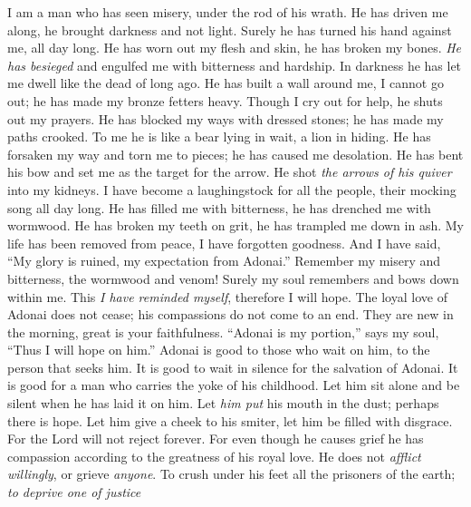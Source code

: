 \begin{biblechapter} %
 I am a man who has seen misery, 
under the rod of his wrath.
\verse He has driven me along, he brought 
darkness and not light.
\verse Surely he has turned his hand against me, 
all day long.
\verse He has worn out my flesh and skin, 
he has broken my bones.
\verse \textit{He has besieged} and engulfed me 
with bitterness and hardship.
\verse In darkness he has let me dwell 
like the dead of long ago.
\verse He has built a wall around me, I cannot go out; 
he has made my bronze fetters heavy.
\verse Though I cry out for help, 
he shuts out my prayers.
\verse He has blocked my ways with dressed stones; 
he has made my paths crooked.
\verse To me he is like a bear lying in wait, 
a lion in hiding.
\verse He has forsaken my way and torn me to pieces; 
he has caused me desolation.
\verse He has bent his bow and set me 
as the target for the arrow.
\verse He shot \textit{the arrows of his quiver} 
into my kidneys.
\verse I have become a laughingstock for all the people, 
their mocking song all day long.
\verse He has filled me with bitterness, 
he has drenched me with wormwood.
\verse He has broken my teeth on grit, 
he has trampled me down in ash.
\verse My life has been removed from peace, 
I have forgotten goodness.
\verse And I have said, “My glory is ruined, 
my expectation from Adonai.”
\verse Remember my misery and bitterness, 
the wormwood and venom!
\verse Surely my soul remembers 
and bows down within me.
\verse This \textit{I have reminded myself}, 
therefore I will hope.
\verse The loyal love of Adonai does not cease; 
his compassions do not come to an end.
\verse They are new in the morning, 
great is your faithfulness.
\verse “Adonai is my portion,” 
says my soul, 
“Thus I will hope on him.”
\verse Adonai is good to those who wait on him, 
to the person that seeks him.
\verse It is good to wait in silence 
for the salvation of Adonai.
\verse It is good for a man who carries 
the yoke of his childhood.
\verse Let him sit alone and be silent 
when he has laid it on him.
\verse Let \textit{him put} his mouth in the dust; 
perhaps there is hope.
\verse Let him give a cheek to his smiter, 
let him be filled with disgrace.
\verse For the Lord will not reject 
forever.
\verse For even though he causes grief he has compassion 
according to the greatness of his royal love.
\verse He does not \textit{afflict willingly}, 
or grieve \textit{anyone}.
\verse To crush under his feet 
all the prisoners of the earth;
\verse \textit{to deprive one of justice} 

\end{biblechapter}
